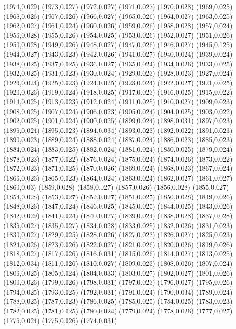 (1974,0.029)
(1973,0.027)
(1972,0.027)
(1971,0.027)
(1970,0.028)
(1969,0.025)
(1968,0.026)
(1967,0.026)
(1966,0.027)
(1965,0.026)
(1964,0.027)
(1963,0.025)
(1962,0.027)
(1961,0.024)
(1960,0.026)
(1959,0.026)
(1958,0.028)
(1957,0.024)
(1956,0.028)
(1955,0.026)
(1954,0.025)
(1953,0.026)
(1952,0.027)
(1951,0.026)
(1950,0.028)
(1949,0.026)
(1948,0.027)
(1947,0.026)
(1946,0.027)
(1945,0.125)
(1944,0.027)
(1943,0.023)
(1942,0.026)
(1941,0.027)
(1940,0.024)
(1939,0.024)
(1938,0.025)
(1937,0.025)
(1936,0.027)
(1935,0.024)
(1934,0.026)
(1933,0.025)
(1932,0.025)
(1931,0.023)
(1930,0.024)
(1929,0.023)
(1928,0.023)
(1927,0.024)
(1926,0.024)
(1925,0.023)
(1924,0.025)
(1923,0.024)
(1922,0.027)
(1921,0.025)
(1920,0.026)
(1919,0.024)
(1918,0.025)
(1917,0.023)
(1916,0.025)
(1915,0.022)
(1914,0.025)
(1913,0.023)
(1912,0.024)
(1911,0.025)
(1910,0.027)
(1909,0.023)
(1908,0.025)
(1907,0.024)
(1906,0.023)
(1905,0.024)
(1904,0.025)
(1903,0.022)
(1902,0.025)
(1901,0.024)
(1900,0.025)
(1899,0.024)
(1898,0.031)
(1897,0.023)
(1896,0.024)
(1895,0.023)
(1894,0.034)
(1893,0.023)
(1892,0.022)
(1891,0.023)
(1890,0.023)
(1889,0.024)
(1888,0.024)
(1887,0.024)
(1886,0.023)
(1885,0.023)
(1884,0.024)
(1883,0.025)
(1882,0.024)
(1881,0.024)
(1880,0.025)
(1879,0.024)
(1878,0.023)
(1877,0.022)
(1876,0.024)
(1875,0.024)
(1874,0.026)
(1873,0.022)
(1872,0.023)
(1871,0.025)
(1870,0.026)
(1869,0.024)
(1868,0.023)
(1867,0.024)
(1866,0.026)
(1865,0.023)
(1864,0.024)
(1863,0.024)
(1862,0.027)
(1861,0.027)
(1860,0.03)
(1859,0.028)
(1858,0.027)
(1857,0.026)
(1856,0.028)
(1855,0.027)
(1854,0.028)
(1853,0.027)
(1852,0.027)
(1851,0.027)
(1850,0.028)
(1849,0.026)
(1848,0.026)
(1847,0.024)
(1846,0.025)
(1845,0.025)
(1844,0.025)
(1843,0.026)
(1842,0.029)
(1841,0.024)
(1840,0.027)
(1839,0.024)
(1838,0.028)
(1837,0.028)
(1836,0.027)
(1835,0.027)
(1834,0.028)
(1833,0.025)
(1832,0.026)
(1831,0.023)
(1830,0.027)
(1829,0.025)
(1828,0.026)
(1827,0.023)
(1826,0.027)
(1825,0.023)
(1824,0.026)
(1823,0.026)
(1822,0.027)
(1821,0.026)
(1820,0.026)
(1819,0.026)
(1818,0.027)
(1817,0.026)
(1816,0.031)
(1815,0.026)
(1814,0.027)
(1813,0.025)
(1812,0.034)
(1811,0.026)
(1810,0.027)
(1809,0.023)
(1808,0.026)
(1807,0.024)
(1806,0.025)
(1805,0.024)
(1804,0.033)
(1803,0.027)
(1802,0.027)
(1801,0.026)
(1800,0.026)
(1799,0.026)
(1798,0.031)
(1797,0.023)
(1796,0.027)
(1795,0.026)
(1794,0.025)
(1793,0.025)
(1792,0.031)
(1791,0.024)
(1790,0.034)
(1789,0.024)
(1788,0.025)
(1787,0.023)
(1786,0.025)
(1785,0.025)
(1784,0.025)
(1783,0.023)
(1782,0.025)
(1781,0.025)
(1780,0.024)
(1779,0.024)
(1778,0.026)
(1777,0.027)
(1776,0.024)
(1775,0.026)
(1774,0.031)
